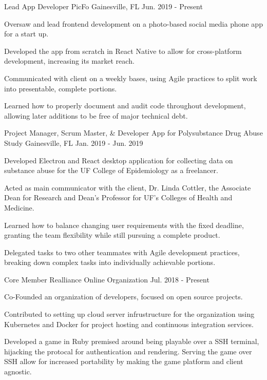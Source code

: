 \begin{cventries}
  \cventry
  {Lead App Developer}
  {PicFo}
  {Gainesville, FL}
  {Jun. 2019 - Present}
  {
    \begin{cvitems}
      \item {Oversaw and lead frontend development on a photo-based social media phone app for a start up.}
      \item {Developed the app from scratch in React Native to allow for cross-platform development, increasing its market reach.}
      \item {Communicated with client on a weekly bases, using Agile practices to split work into presentable, complete portions.}
      \item {Learned how to properly document and audit code throughout development, allowing later additions to be free of major technical debt.}
    \end{cvitems}
  }
  \cventry
    {Project Manager, Scrum Master, \& Developer}
    {App for Polysubstance Drug Abuse Study}
    {Gainesville, FL}
    {Jan. 2019 - Jun. 2019}
    {
      \begin{cvitems}
        \item {Developed Electron and React desktop application for collecting data on substance abuse for the UF College of Epidemiology as a freelancer.}
        \item {Acted as main communicator with the client, Dr. Linda Cottler, the Associate Dean for Research and Dean's Professor for UF's Colleges of Health and Medicine.}
        \item {Learned how to balance changing user requirements with the fixed deadline, granting the team flexibility while still pursuing a complete product.}
        \item {Delegated tasks to two other teammates with Agile development practices, breaking down complex tasks into individually achievable portions.}
      \end{cvitems}
    }
  \cventry
    {Core Member}
    {Realliance}
    {Online Organization}
    {Jul. 2018 - Present}
    {
      \begin{cvitems}
        \item {Co-Founded an organization of developers, focused on open source projects.}
        \item {Contributed to setting up cloud server infrustructure for the organization using Kubernetes and Docker for project hosting and continuous integration services.}
        \item {Developed a game in Ruby premised around being playable over a SSH terminal, hijacking the protocal for authentication and rendering. Serving the game over SSH allow for increased portability by making the game platform and client agnostic.}
      \end{cvitems}
    }
\end{cventries}
